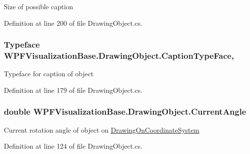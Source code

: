 Size of possible caption 



Definition at line 200 of file Drawing\+Object.\+cs.

\subsubsection[{\texorpdfstring{Caption\+Type\+Face}{CaptionTypeFace}}]{\setlength{\rightskip}{0pt plus 5cm}Typeface W\+P\+F\+Visualization\+Base.\+Drawing\+Object.\+Caption\+Type\+Face\hspace{0.3cm}{\ttfamily [get]}, {\ttfamily [set]}}\hypertarget{class_w_p_f_visualization_base_1_1_drawing_object_ad47a93196649fe058b6481afcd362952}{}\label{class_w_p_f_visualization_base_1_1_drawing_object_ad47a93196649fe058b6481afcd362952}


Typeface for caption of object 



Definition at line 179 of file Drawing\+Object.\+cs.

\subsubsection[{\texorpdfstring{Current\+Angle}{CurrentAngle}}]{\setlength{\rightskip}{0pt plus 5cm}double W\+P\+F\+Visualization\+Base.\+Drawing\+Object.\+Current\+Angle\hspace{0.3cm}{\ttfamily [get]}}\hypertarget{class_w_p_f_visualization_base_1_1_drawing_object_a13a8b25a49fd91e218208a22fde834ec}{}\label{class_w_p_f_visualization_base_1_1_drawing_object_a13a8b25a49fd91e218208a22fde834ec}


Current rotation angle of object on \hyperlink{class_w_p_f_visualization_base_1_1_drawing_on_coordinate_system}{Drawing\+On\+Coordinate\+System} 



Definition at line 124 of file Drawing\+Object.\+cs.

